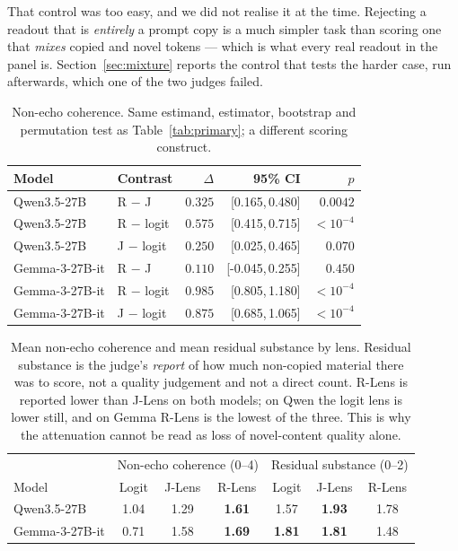 \documentclass[11pt]{article}
\newcommand{\ci}[2]{[#1,\,#2]}
\newcommand{\flag}[1]{\textcolor{flagged}{#1}}
\begin{document}
\flag{That control was too easy, and we did not realise it at the time.}
Rejecting a readout that is \emph{entirely} a prompt copy is a much simpler task
than scoring one that \emph{mixes} copied and novel tokens --- which is what
every real readout in the panel is. Section~\ref{sec:mixture} reports the control
that tests the harder case, run afterwards, which one of the two judges failed.

\begin{table}[h]
\centering
\small
\begin{tabular}{llrrr}
\toprule
Model & Contrast & $\Delta$ & 95\% CI & $p$ \\
\midrule
Qwen3.5-27B & R $-$ J     & $0.325$ & \ci{0.165}{0.480} & $0.0042$ \\
Qwen3.5-27B & R $-$ logit & $0.575$ & \ci{0.415}{0.715} & $<10^{-4}$ \\
Qwen3.5-27B & J $-$ logit & $0.250$ & \ci{0.025}{0.465} & $0.070$ \\
\addlinespace
Gemma-3-27B-it & R $-$ J     & $0.110$ & \ci{-0.045}{0.255} & $0.450$ \\
Gemma-3-27B-it & R $-$ logit & $0.985$ & \ci{0.805}{1.180} & $<10^{-4}$ \\
Gemma-3-27B-it & J $-$ logit & $0.875$ & \ci{0.685}{1.065} & $<10^{-4}$ \\
\bottomrule
\end{tabular}
\caption{Non-echo coherence. Same estimand, estimator, bootstrap and permutation
test as Table~\ref{tab:primary}; a different scoring construct.}
\label{tab:nonecho}
\end{table}

\begin{table}[h]
\centering
\small
\begin{tabular}{lccc|ccc}
\toprule
& \multicolumn{3}{c|}{Non-echo coherence (0--4)}
& \multicolumn{3}{c}{Residual substance (0--2)} \\
Model & Logit & J-Lens & R-Lens & Logit & J-Lens & R-Lens \\
\midrule
Qwen3.5-27B    & 1.04 & 1.29 & \textbf{1.61} & 1.57 & \textbf{1.93} & 1.78 \\
Gemma-3-27B-it & 0.71 & 1.58 & \textbf{1.69} & \textbf{1.81} & \textbf{1.81} & 1.48 \\
\bottomrule
\end{tabular}
\caption{Mean non-echo coherence and mean residual substance by lens. Residual
substance is the judge's \emph{report} of how much non-copied material there was
to score, not a quality judgement and not a direct count. R-Lens is reported
lower than J-Lens on both models; on Qwen the logit lens is lower still, and on
Gemma R-Lens is the lowest of the three. This is why the attenuation cannot be
read as loss of novel-content quality alone.}
\label{tab:nonechomeans}
\end{table}
\end{document}
